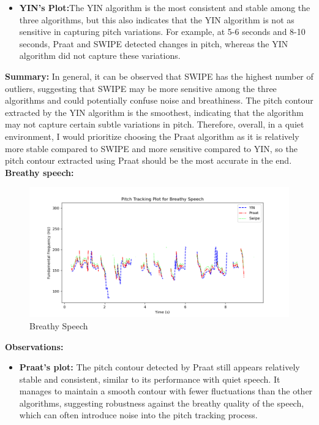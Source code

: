 \documentclass{../labbook}
\begin{document}
\begin{solution}
\begin{itemize}
    \item \textbf{YIN's Plot:}The YIN algorithm is the most consistent and stable among the three algorithms, but this also indicates that the YIN algorithm is not as sensitive in capturing pitch variations. For example, at 5-6 seconds and 8-10 seconds, Praat and SWIPE detected changes in pitch, whereas the YIN algorithm did not capture these variations.

\end{itemize}

\textbf{Summary:} In general, it can be observed that SWIPE has the highest number of outliers, suggesting that SWIPE may be more sensitive among the three algorithms and could potentially confuse noise and breathiness. The pitch contour extracted by the YIN algorithm is the smoothest, indicating that the algorithm may not capture certain subtle variations in pitch. Therefore, overall, in a quiet environment, I would prioritize choosing the Praat algorithm as it is relatively more stable compared to SWIPE and more sensitive compared to YIN, so the pitch contour extracted using Praat should be the most accurate in the end.\\

\textbf{Breathy speech:}
\begin{figure}[h]
    \centering
    \includegraphics[width=0.8\linewidth]{recording3_breathy_m_pitch_plot.png}
    \caption{Breathy Speech}
    \label{Breathy speech}
\end{figure}

\textbf{Observations:}
\begin{itemize}
    \item \textbf{Praat's plot:} The pitch contour detected by Praat still appears relatively stable and consistent, similar to its performance with quiet speech. It manages to maintain a smooth contour with fewer fluctuations than the other algorithms, suggesting robustness against the breathy quality of the speech, which can often introduce noise into the pitch tracking process.




\end{itemize}
\end{solution}
\end{document}
